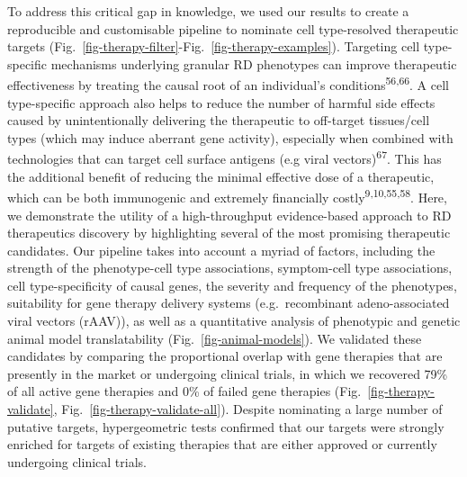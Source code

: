 \documentclass[
sn-nature
]{sn-jnl}
\begin{document}
To address this critical gap in knowledge, we used our results to create
a reproducible and customisable pipeline to nominate cell type-resolved
therapeutic targets
(Fig.~\ref{fig-therapy-filter}-Fig.~\ref{fig-therapy-examples}).
Targeting cell type-specific mechanisms underlying granular RD
phenotypes can improve therapeutic effectiveness by treating the causal
root of an individual's conditions\textsuperscript{56,66}. A cell
type-specific approach also helps to reduce the number of harmful side
effects caused by unintentionally delivering the therapeutic to
off-target tissues/cell types (which may induce aberrant gene activity),
especially when combined with technologies that can target cell surface
antigens (e.g viral vectors)\textsuperscript{67}. This has the
additional benefit of reducing the minimal effective dose of a
therapeutic, which can be both immunogenic and extremely financially
costly\textsuperscript{9,10,55,58}. Here, we demonstrate the utility of
a high-throughput evidence-based approach to RD therapeutics discovery
by highlighting several of the most promising therapeutic candidates.
Our pipeline takes into account a myriad of factors, including the
strength of the phenotype-cell type associations, symptom-cell type
associations, cell type-specificity of causal genes, the severity and
frequency of the phenotypes, suitability for gene therapy delivery
systems (e.g.~recombinant adeno-associated viral vectors (rAAV)), as
well as a quantitative analysis of phenotypic and genetic animal model
translatability (Fig.~\ref{fig-animal-models}). We validated these
candidates by comparing the proportional overlap with gene therapies
that are presently in the market or undergoing clinical trials, in which
we recovered 79\% of all active gene therapies and 0\% of failed gene
therapies (Fig.~\ref{fig-therapy-validate},
Fig.~\ref{fig-therapy-validate-all}). Despite nominating a large number
of putative targets, hypergeometric tests confirmed that our targets
were strongly enriched for targets of existing therapies that are either
approved or currently undergoing clinical trials.
\end{document}
